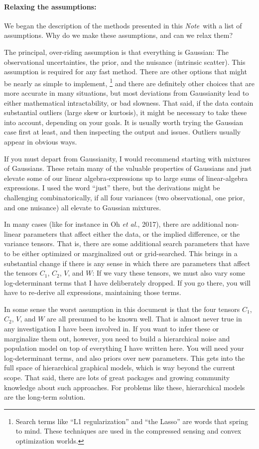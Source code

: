 \documentclass[12pt,letterpaper]{article}
\newcommand{\foreign}[1]{\textsl{#1}}
\newcommand{\documentname}{\textsl{Note}}
\newcommand{\etal}{\foreign{et al.}}
\begin{document}
\paragraph{Relaxing the assumptions:}
We began the description of the methods presented in this
\documentname\ with a list of assumptions. Why do we make these
assumptions, and can we relax them?

The principal, over-riding assumption is that everything is Gaussian:
The observational uncertainties, the prior, and the nuisance
(intrinsic scatter). This assumption is required for any fast
method. There are other options that might be nearly as simple to implement,%
\footnote{Search terms like ``L1 regularization'' and ``the Lasso''
  are words that spring to mind. These techniques are used in the
  compressed sensing and convex optimization worlds.}
and there are
definitely other choices that are more accurate in many situations,
but most deviations from Gaussianity lead to either mathematical
intractability, or bad slowness. That said, if the data contain
substantial outliers (large skew or kurtosis), it might be necessary
to take these into account, depending on your goals. It is usually worth
trying the Gaussian case first at least, and then inspecting the
output and issues. Outliers usually appear in obvious ways.

If you must depart from Gaussianity, I would recommend starting with
mixtures of Gaussians. These retain many of the valuable properties of
Gaussians and just elevate some of our linear algebra-expressions up
to large sums of linear-algebra expressions. I used the word ``just''
there, but the derivations might be challenging combinatorically, if
all four variances (two observational, one prior, and one nuisance)
all elevate to Gaussian mixtures.

In many cases (like for instance in Oh \etal, 2017), there are
additional non-linear parameters that affect either the data, or the
implied difference, or the variance tensors. That is, there are some
additional search parameters that have to be either optimized or
marginalized out or grid-searched. This brings in a substantial change
if there is any sense in which there are parameters that affect the
tensors $C_1$, $C_2$, $V$, and $W$: If we vary these tensors, we must
also vary some log-determinant terms that I have deliberately
dropped. If you go there, you will have to re-derive all expressions,
maintaining those terms.

In some sense the worst assumption in this document is that the four
tensors $C_1$, $C_2$, $V$, and $W$ are all presumed to be known well.
That is almost never true in any investigation I have been involved
in.  If you want to infer these or marginalize them out, however, you
need to build a hierarchical noise and population model on top of
everything I have written here. You will need your log-determinant
terms, and also priors over new parameters. This gets into the full
space of hierarchical graphical models, which is way beyond the
current scope. That said, there are lots of great packages and growing
community knowledge about such approaches. For problems like these,
hierarchical models are the long-term solution.
\end{document}
